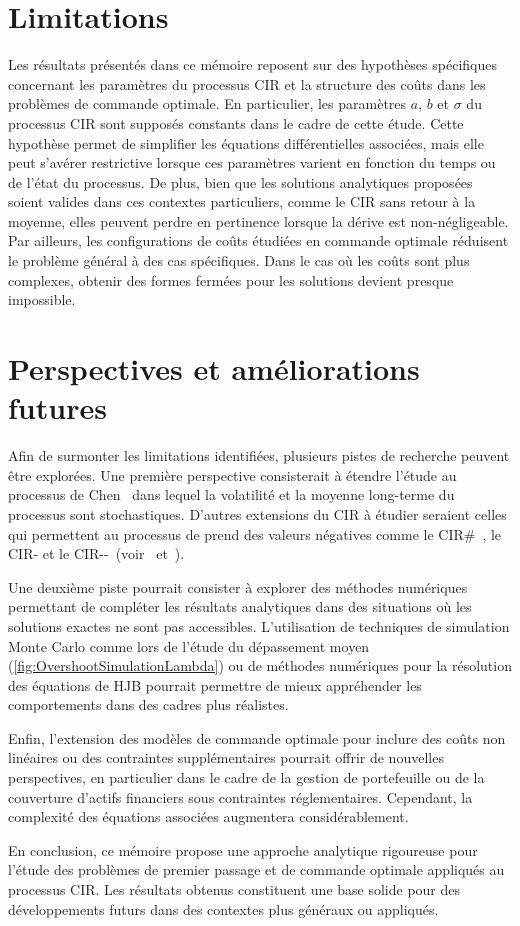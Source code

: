 \section{Limitations}

Les résultats présentés dans ce mémoire reposent sur des hypothèses spécifiques concernant les paramètres du processus CIR et la structure des coûts dans les problèmes de commande optimale. En particulier, les paramètres \(a\), \(b\) et \(\sigma\) du processus \acs{CIR} sont supposés constants dans le cadre de cette étude. Cette hypothèse permet de simplifier les équations différentielles associées, mais elle peut s'avérer restrictive lorsque ces paramètres varient en fonction du temps ou de l'état du processus. De plus, bien que les solutions analytiques proposées soient valides dans ces contextes particuliers, comme le \acs{CIR} sans retour à la moyenne, elles peuvent perdre en pertinence lorsque la dérive est non-négligeable. Par ailleurs, les configurations de coûts étudiées en commande optimale réduisent le problème général à des cas spécifiques. Dans le cas où les coûts sont plus complexes, obtenir des formes fermées pour les solutions devient presque impossible.

\section{Perspectives et améliorations futures}

Afin de surmonter les limitations identifiées, plusieurs pistes de recherche peuvent être explorées. Une première perspective consisterait à étendre l'étude au processus de Chen~\cite{chen1996} dans lequel la volatilité et la moyenne long-terme du processus sont stochastiques. D'autres extensions du \acs{CIR} à étudier seraient celles qui permettent au processus de prend des valeurs négatives comme le CIR\#~\cite{orlando2019}, le CIR- et le CIR-{}-~(voir~\cite{difrancesco2021} et~\cite{difrancesco2022}).

Une deuxième piste pourrait consister à explorer des méthodes numériques permettant de compléter les résultats analytiques dans des situations où les solutions exactes ne sont pas accessibles. L'utilisation de techniques de simulation Monte Carlo comme lors de l'étude du dépassement moyen (\ref{fig:OvershootSimulationLambda}) ou de méthodes numériques pour la résolution des équations de \acs{HJB} pourrait permettre de mieux appréhender les comportements dans des cadres plus réalistes.

Enfin, l'extension des modèles de commande optimale pour inclure des coûts non linéaires ou des contraintes supplémentaires pourrait offrir de nouvelles perspectives, en particulier dans le cadre de la gestion de portefeuille ou de la couverture d'actifs financiers sous contraintes réglementaires. Cependant, la complexité des équations associées augmentera considérablement.

En conclusion, ce mémoire propose une approche analytique rigoureuse pour l'étude des problèmes de premier passage et de commande optimale appliqués au processus \acs{CIR}. Les résultats obtenus constituent une base solide pour des développements futurs dans des contextes plus généraux ou appliqués.